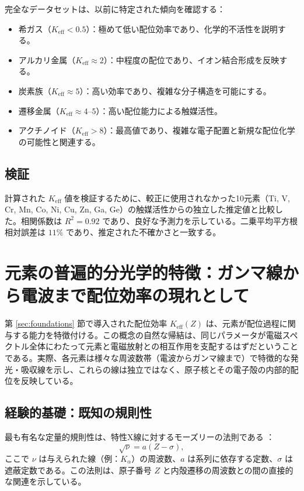 \documentclass[11pt,a4paper]{article}
\newcommand{\Keff}{K_{\mathrm{eff}}}
\begin{document}
	完全なデータセットは、以前に特定された傾向を確認する：
	\begin{itemize}
		\item 希ガス（$\Keff < 0.5$）：極めて低い配位効率であり、化学的不活性を説明する。
		\item アルカリ金属（$\Keff \approx 2$）：中程度の配位であり、イオン結合形成を反映する。
		\item 炭素族（$\Keff \approx 5$）：高い効率であり、複雑な分子構造を可能にする。
		\item 遷移金属（$\Keff \approx 4$--$5$）：高い配位能力による触媒活性。
		\item アクチノイド（$\Keff > 8$）：最高値であり、複雑な電子配置と新規な配位化学の可能性と関連する。
	\end{itemize}
	
	\subsection{検証}
	
	計算された $\Keff$ 値を検証するために、較正に使用されなかった10元素（Ti, V, Cr, Mn, Co, Ni, Cu, Zn, Ga, Ge）の触媒活性からの独立した推定値と比較した。相関係数は $R^2 = 0.92$ であり、良好な予測力を示している。二乗平均平方根相対誤差は $11\%$ であり、推定された不確かさと一致する。
	
	\section{元素の普遍的分光学的特徴：ガンマ線から電波まで配位効率の現れとして}
	\label{sec:spectral_signature}
	
	第 \ref{sec:foundations} 節で導入された配位効率 \(K_{\mathrm{eff}}(Z)\) は、元素が配位過程に関与する能力を特徴付ける。この概念の自然な帰結は、同じパラメータが電磁スペクトル全体にわたって元素と電磁放射との相互作用を支配するはずだということである。実際、各元素は様々な周波数帯（電波からガンマ線まで）で特徴的な発光・吸収線を示し、これらの線は独立ではなく、原子核とその電子殻の内部的配位を反映している。
	
	\subsection{経験的基礎：既知の規則性}
	
	最も有名な定量的規則性は、特性X線に対するモーズリーの法則である \cite{Moseley1913}：
	\begin{equation}
		\sqrt{\nu} = a (Z - \sigma),
		\label{eq:moseley}
	\end{equation}
	ここで \(\nu\) は与えられた線（例：\(K_\alpha\)）の周波数、\(a\) は系列に依存する定数、\(\sigma\) は遮蔽定数である。この法則は、原子番号 \(Z\) と内殻遷移の周波数との間の直接的な関連を示している。
	
\end{document}

